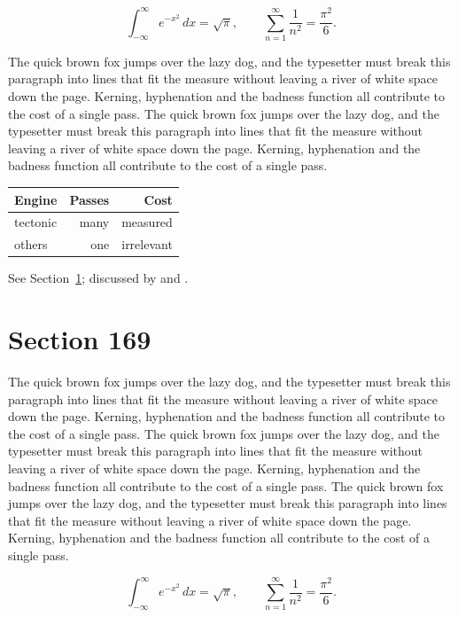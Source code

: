 \documentclass{article}
\begin{document}
\begin{equation}\label{eq:168}
\int_{-\infty}^{\infty} e^{-x^{2}}\,dx = \sqrt{\pi}, \qquad
\sum_{n=1}^{\infty} \frac{1}{n^{2}} = \frac{\pi^{2}}{6}.
\end{equation}

The quick brown fox jumps over the lazy dog, and the typesetter must break this paragraph into lines that fit the measure without leaving a river of white space down the page. Kerning, hyphenation and the badness function all contribute to the cost of a single pass. The quick brown fox jumps over the lazy dog, and the typesetter must break this paragraph into lines that fit the measure without leaving a river of white space down the page. Kerning, hyphenation and the badness function all contribute to the cost of a single pass. 

\begin{center}
\begin{tabular}{lrr}
\toprule
Engine & Passes & Cost \\
\midrule
tectonic & many & measured \\
others & one & irrelevant \\
\bottomrule
\end{tabular}
\end{center}

See Section~\ref{sec:169}; discussed by \textcite{k4} and \textcite{l1}.
\section{Section 169}
\label{sec:169}
The quick brown fox jumps over the lazy dog, and the typesetter must break this paragraph into lines that fit the measure without leaving a river of white space down the page. Kerning, hyphenation and the badness function all contribute to the cost of a single pass. The quick brown fox jumps over the lazy dog, and the typesetter must break this paragraph into lines that fit the measure without leaving a river of white space down the page. Kerning, hyphenation and the badness function all contribute to the cost of a single pass. The quick brown fox jumps over the lazy dog, and the typesetter must break this paragraph into lines that fit the measure without leaving a river of white space down the page. Kerning, hyphenation and the badness function all contribute to the cost of a single pass. 

\begin{equation}\label{eq:169}
\int_{-\infty}^{\infty} e^{-x^{2}}\,dx = \sqrt{\pi}, \qquad
\sum_{n=1}^{\infty} \frac{1}{n^{2}} = \frac{\pi^{2}}{6}.
\end{equation}
\end{document}
